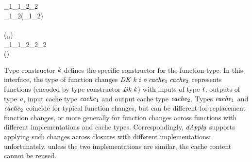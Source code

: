 \begin{hscode}
\>[B]{}\<[3]%
\>[3]{}\;\;\;\;\mathrel{:\mkern-1mu:}\<[E]%
\\
\>[B]{}\<[3]%
\>[3]{}\mathrel{:\mkern-1mu:}\;\;\;\Rightarrow{}\<[E]%
\\
\>[3]{}\<[5]%
\>[5]{}\;\;\;_{1}\to {}\;\;\;\;_{1}\;_{2}\to {}\;\;\;_{2}{}\<[E]%
\\[\blanklineskip]%
\>[B]{}\<[3]%
\>[3]{}\mathrel{:\mkern-1mu:}\;\;\;\;_{1}\;_{2}\to {}\;(_{1}\mathrel{:\mkern-1mu\sim\mkern-1mu:}_{2}){}\<[E]%
\\[\blanklineskip]%
\>[B]{}\mathrel{:\mkern-1mu:}{}\<[E]%
\\
\>[B]{}\<[3]%
\>[3]{}(\;,\;\;\;,\;\;\;)\Rightarrow{}\<[E]%
\\
\>[B]{}\<[3]%
\>[3]{}\;\;\;_{1}\to {}\;\;\;\;_{1}\;_{2}\to {}\;\;\;\;_{2}\;_{2}{}\<[E]%
\\
\>[B]{}\;\;\mathrel{=}\;(){}\<[E]%
\ColumnHook
\end{hscode}\resethooks
Type constructor \ensuremath{\Varid{k}} defines the specific constructor for the function type.
In this interface, the type of function changes \ensuremath{\Conid{DK}\;\Varid{k}\;\Varid{i}\;\Varid{o}\;\Varid{cache}_{1}\;\Varid{cache}_{2}}
represents functions (encoded by type constructor \ensuremath{\Conid{Dk}\;\Varid{k}}) with inputs of type
\ensuremath{\Varid{i}}, outputs of type \ensuremath{\Varid{o}}, input cache type \ensuremath{\Varid{cache}_{1}} and output cache type
\ensuremath{\Varid{cache}_{2}}. Types \ensuremath{\Varid{cache}_{1}} and \ensuremath{\Varid{cache}_{2}} coincide for typical function changes, but
can be different for replacement function changes, or more generally for
function changes across functions with different implementations and cache types.
Correspondingly, \ensuremath{\Varid{dApply}} supports applying such changes across closures with
different implementations: unfortunately, unless the two implementations are
similar, the cache content cannot be reused.

